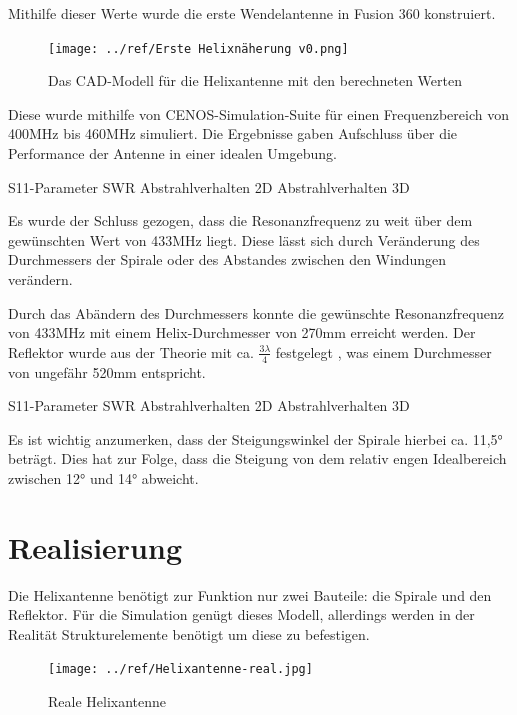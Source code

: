 Mithilfe dieser Werte wurde die erste Wendelantenne in Fusion 360 konstruiert. 

\begin{figure}[h!]
	\centering
	\texttt{[image: ../ref/Erste Helixnäherung v0.png]}
	\label{fig:ersteHelixnäherung}
	\caption{Das CAD-Modell für die Helixantenne mit den berechneten Werten}
\end{figure}

Diese wurde mithilfe von CENOS-Simulation-Suite für einen Frequenzbereich von 400MHz bis 460MHz simuliert. Die Ergebnisse gaben Aufschluss über die Performance der Antenne in einer idealen Umgebung.

S11-Parameter
SWR
Abstrahlverhalten 2D
Abstrahlverhalten 3D

Es wurde der Schluss gezogen, dass die Resonanzfrequenz zu weit über dem gewünschten Wert von 433MHz liegt. Diese lässt sich durch Veränderung des Durchmessers der Spirale oder des Abstandes zwischen den Windungen verändern.

Durch das Abändern des Durchmessers konnte die gewünschte Resonanzfrequenz von 433MHz mit einem Helix-Durchmesser von 270mm erreicht werden. Der Reflektor wurde aus der Theorie mit ca. $\frac{3\lambda}{4}$ festgelegt \cite{Kraus-2002-AntennasB}, was einem Durchmesser von ungefähr 520mm entspricht.

S11-Parameter
SWR
Abstrahlverhalten 2D
Abstrahlverhalten 3D

Es ist wichtig anzumerken, dass der Steigungswinkel der Spirale hierbei ca. 11,5° beträgt. Dies hat zur Folge, dass die Steigung von dem relativ engen Idealbereich zwischen 12° und 14° abweicht.

\section{Realisierung}
Die Helixantenne benötigt zur Funktion nur zwei Bauteile: die Spirale und den Reflektor. Für die Simulation genügt dieses Modell, allerdings werden in der Realität Strukturelemente benötigt um diese zu befestigen.

\begin{figure}[H]
	\centering
	\texttt{[image: ../ref/Helixantenne-real.jpg]}
	\caption{Reale Helixantenne}
	\label{fig:helix-real}
\end{figure}

